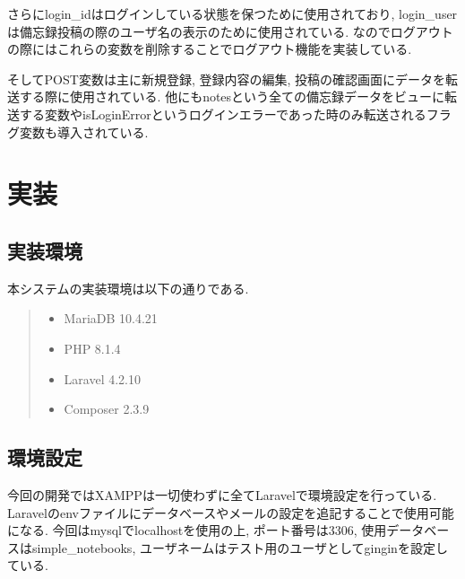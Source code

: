 \documentclass[submit,techrep]{ipsj}
\begin{document}
さらにlogin\_idはログインしている状態を保つために使用されており, login\_userは備忘録投稿の際のユーザ名の表示のために使用されている. なのでログアウトの際にはこれらの変数を削除することでログアウト機能を実装している. 

そしてPOST変数は主に新規登録, 登録内容の編集, 投稿の確認画面にデータを転送する際に使用されている. 
他にもnotesという全ての備忘録データをビューに転送する変数やisLoginErrorというログインエラーであった時のみ転送されるフラグ変数も導入されている. 

\section{実装}
\subsection{実装環境}
本システムの実装環境は以下の通りである. 

\begin{quote}
 \begin{itemize}
 \item MariaDB 10.4.21
 \item PHP 8.1.4
 \item Laravel 4.2.10
 \item Composer 2.3.9
 \end{itemize}
\end{quote}

\subsection{環境設定}
今回の開発ではXAMPPは一切使わずに全てLaravelで環境設定を行っている.
Laravelのenvファイルにデータベースやメールの設定を追記することで使用可能になる. 今回はmysqlでlocalhostを使用の上, ポート番号は3306, 使用データベースはsimple\_notebooks, ユーザネームはテスト用のユーザとしてginginを設定している. 
\end{document}
